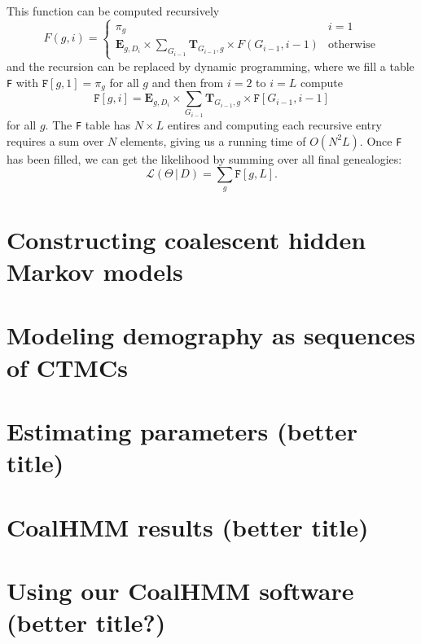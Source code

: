 \documentclass[graybox]{svmult}
\newcommand{\G}{\ensuremath{G}}
\renewcommand{\D}{\ensuremath{D}}
\renewcommand{\lhd}{\ensuremath{\mathcal{L}}}
\newcommand{\T}{\ensuremath{\mathbf{T}}}
\renewcommand{\E}{\ensuremath{\mathbf{E}}}
\begin{document}
This function can be computed recursively
\begin{equation}
  F(g,i) = 
  \begin{cases}
  	\pi_g & i = 1 \\
  	\E_{g,\D_i} \times \sum_{\G_{i-1}}\T_{\G_{i-1},g} \times F(\G_{i-1},i-1)
  	& \mathrm{otherwise}
  \end{cases}
\end{equation}
and the recursion can be replaced by dynamic programming, where we fill a table \texttt{F} with $\mathtt{F}[g,1] = \pi_g$ for all $g$ and then from $i=2$ to $i=L$ compute
\[
\mathtt{F}[g,i] = \E_{g,\D_i} \times \sum_{\G_{i-1}}\T_{\G_{i-1},g} \times \mathtt{F}[\G_{i-1},i-1]
\]
for all $g$. The \texttt{F} table has $N\times L$ entires and computing each recursive entry requires a sum over $N$ elements, giving us a running time of $O(N^2L)$. Once \texttt{F} has been filled, we can get the likelihood by summing over all final genealogies:
\begin{equation}
  \lhd(\Theta\,|\,\D) = \sum_{g} \mathtt{F}[g,L].
\end{equation}


\section{Constructing coalescent hidden Markov models}


\section{Modeling demography as sequences of CTMCs}




\section{Estimating parameters (better title)}

\section{CoalHMM results (better title)}

\section{Using our CoalHMM software (better title?)}




\end{document}
